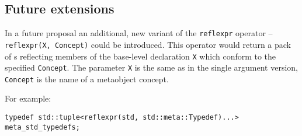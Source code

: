 \subsection{Future extensions}

In a future proposal an additional, new variant of the \texttt{reflexpr} operator
-- \texttt{reflexpr(X, Concept)} could be introduced.
This operator would return a pack of s reflecting members of
the base-level declaration \texttt{X} which conform to the specified
\texttt{Concept}. The parameter \texttt{X} is the same as in the single argument
version, \texttt{Concept} is the name of a metaobject concept.

For example:

\begin{verbatim}
typedef std::tuple<reflexpr(std, std::meta::Typedef)...> meta_std_typedefs;
\end{verbatim}
